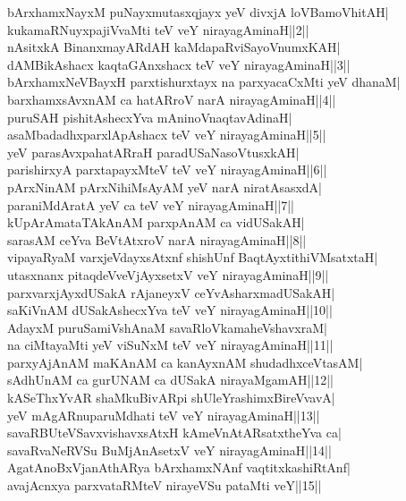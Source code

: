\documentclass{article}
\begin{document}
bArxhamxNayxM puNayxmutasxqjayx yeV divxjA loVBamoVhitAH|\\
kukamaRNuyxpajiVvaMti teV veY nirayagAminaH||2||\\
nAsitxkA BinanxmayARdAH kaMdapaRviSayoVnumxKAH|\\
dAMBikAshacx kaqtaGAnxshacx teV veY nirayagAminaH||3||\\
bArxhamxNeVBayxH parxtishurxtayx na parxyacaCxMti yeV dhanaM|\\
barxhamxsAvxnAM ca hatARroV narA nirayagAminaH||4||\\
puruSAH pishitAshecxYva mAninoVnaqtavAdinaH|\\
asaMbadadhxparxlApAshacx teV veY nirayagAminaH||5||\\
yeV parasAvxpahatARraH paradUSaNasoVtusxkAH|\\
parishirxyA parxtapayxMteV teV veY nirayagAminaH||6||\\
pArxNinAM pArxNihiMsAyAM yeV narA niratAsasxdA|\\
paraniMdAratA yeV ca teV veY nirayagAminaH||7||\\
kUpArAmataTAkAnAM parxpAnAM ca vidUSakAH|\\
sarasAM ceYva BeVtAtxroV narA nirayagAminaH||8||\\
vipayaRyaM varxjeVdayxsAtxnf shishUnf BaqtAyxtithiVMsatxtaH|\\
utasxnanx pitaqdeVveVjAyxsetxV veY nirayagAminaH||9||\\
parxvarxjAyxdUSakA rAjaneyxV ceYvAsharxmadUSakAH|\\
saKiVnAM dUSakAshecxYva teV veY nirayagAminaH||10||\\
AdayxM puruSamiVshAnaM savaRloVkamaheVshavxraM|\\
na ciMtayaMti yeV viSuNxM teV veY nirayagAminaH||11||\\
parxyAjAnAM maKAnAM ca kanAyxnAM shudadhxceVtasAM|\\
sAdhUnAM ca gurUNAM ca dUSakA nirayaMgamAH||12||\\
kASeThxYvAR shaMkuBivARpi shUleYrashimxBireVvavA|\\
yeV mAgARnuparuMdhati teV veY nirayagAminaH||13||\\
savaRBUteVSavxvishavxsAtxH kAmeVnAtARsatxtheYva ca|\\
savaRvaNeRVSu BuMjAnAsetxV veY nirayagAminaH||14||\\
AgatAnoBxVjanAthARya bArxhamxNAnf vaqtitxkashiRtAnf|\\
avajAcnxya parxvataRMteV nirayeVSu pataMti veY||15||\\
\end{document}
